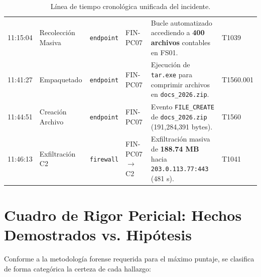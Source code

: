\documentclass[11pt,a4paper]{article}
\begin{document}
\begin{table}[h!]
\begin{tabularx}{\textwidth}{l p{2.2cm} l p{3.2cm} X l}
11:15:04 & Recolección Masiva & \texttt{endpoint} & FIN-PC07 & Bucle automatizado accediendo a \textbf{400 archivos} contables en FS01. & T1039 \\
11:41:27 & Empaquetado & \texttt{endpoint} & FIN-PC07 & Ejecución de \texttt{tar.exe} para comprimir archivos en \texttt{docs\_2026.zip}. & T1560.001 \\
11:44:51 & Creación Archivo & \texttt{endpoint} & FIN-PC07 & Evento \texttt{FILE\_CREATE} de \texttt{docs\_2026.zip} (191,284,391 bytes). & T1560 \\
11:46:13 & Exfiltración C2 & \texttt{firewall} & FIN-PC07 $\rightarrow$ C2 & Exfiltración masiva de \textbf{188.74 MB} hacia \texttt{203.0.113.77:443} (481 s). & T1041 \\
\bottomrule
\end{tabularx}
\caption{Línea de tiempo cronológica unificada del incidente.}
\end{table}

\section{Cuadro de Rigor Pericial: Hechos Demostrados vs. Hipótesis}

Conforme a la metodología forense requerida para el máximo puntaje, se clasifica de forma categórica la certeza de cada hallazgo:
\end{document}
